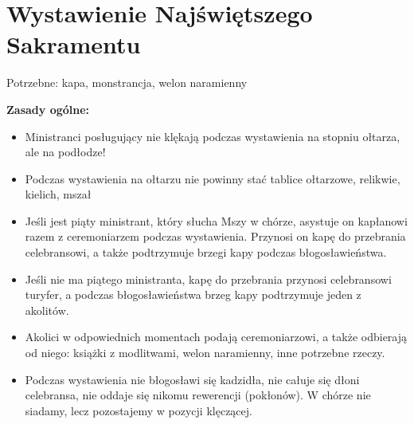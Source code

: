 	\section{Wystawienie Najświętszego Sakramentu}
	
		\begin{center}
			Potrzebne: kapa, monstrancja, welon naramienny
		\end{center}
	
		\textbf{Zasady ogólne:}
		\begin{itemize}
			\item Ministranci posługujący nie klękają podczas wystawienia na stopniu ołtarza, ale na podłodze!
			\item Podczas wystawienia na ołtarzu nie powinny stać tablice ołtarzowe, relikwie, kielich, mszał
			\item Jeśli jest piąty ministrant, który słucha Mszy w chórze, asystuje on kapłanowi razem z ceremoniarzem podczas wystawienia. Przynosi on kapę do przebrania celebransowi, a także podtrzymuje brzegi kapy podczas błogosławieństwa.
			\item Jeśli nie ma piątego ministranta, kapę do przebrania przynosi celebransowi turyfer, a podczas błogosławieństwa brzeg kapy podtrzymuje jeden z akolitów.
			\item Akolici w odpowiednich momentach podają ceremoniarzowi, a także odbierają od niego: książki z modlitwami, welon naramienny, inne potrzebne rzeczy.
			\item Podczas wystawienia nie błogosławi się kadzidła, nie całuje się dłoni celebransa, nie oddaje się nikomu rewerencji (pokłonów). W chórze nie siadamy, lecz pozostajemy w pozycji klęczącej.	
		\end{itemize}
	
